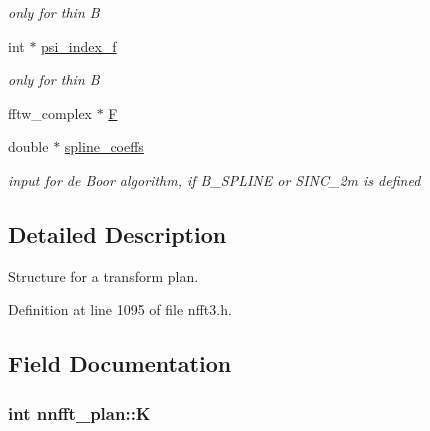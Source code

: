 \begin{CompactItemize}
\begin{CompactList}\small\item\em only for thin B \item\end{CompactList}\item 
\hypertarget{structnnfft__plan_2ada74222958e630640e6456e9bd2a8d}{
int $\ast$ \hyperlink{structnnfft__plan_2ada74222958e630640e6456e9bd2a8d}{psi\_\-index\_\-f}}
\label{structnnfft__plan_2ada74222958e630640e6456e9bd2a8d}

\begin{CompactList}\small\item\em only for thin B \item\end{CompactList}\item 
\hypertarget{structnnfft__plan_86c8933dfbdbef02b98fd961bf00e01b}{
fftw\_\-complex $\ast$ \hyperlink{structnnfft__plan_86c8933dfbdbef02b98fd961bf00e01b}{F}}
\label{structnnfft__plan_86c8933dfbdbef02b98fd961bf00e01b}

\item 
\hypertarget{structnnfft__plan_c3e3c4b14a5227a96b8627faf6933652}{
double $\ast$ \hyperlink{structnnfft__plan_c3e3c4b14a5227a96b8627faf6933652}{spline\_\-coeffs}}
\label{structnnfft__plan_c3e3c4b14a5227a96b8627faf6933652}

\begin{CompactList}\small\item\em input for de Boor algorithm, if B\_\-SPLINE or SINC\_\-2m is defined \item\end{CompactList}\end{CompactItemize}


\subsection{Detailed Description}
Structure for a transform plan. 

Definition at line 1095 of file nfft3.h.

\subsection{Field Documentation}
\hypertarget{structnnfft__plan_4ee39bebbff40746c2701ade2e13f1f8}{
\subsubsection{\setlength{\rightskip}{0pt plus 5cm}int {\bf nnfft\_\-plan::K}}}
\label{structnnfft__plan_4ee39bebbff40746c2701ade2e13f1f8}


